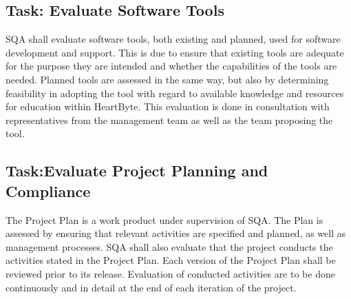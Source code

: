 \documentclass{article}
\begin{document}
	
	\subsection{Task: Evaluate Software Tools}
	SQA shall evaluate software tools, both existing and planned, used for software development and support. This is due to ensure that existing tools are adequate for the purpose they are intended and whether the capabilities of the tools are needed. Planned tools are assessed in the same way, but also by determining feasibility in adopting the tool with regard to available knowledge and resources for education within HeartByte. This evaluation is done in consultation with representatives from the management team as well as the team proposing the tool.
	
	\subsection{Task:Evaluate Project Planning and Compliance}
	The Project Plan is a work product under supervision of SQA. The Plan is assessed by ensuring that relevant activities are specified and planned, as well as management processes. SQA shall also evaluate that the project conducts the activities stated in the Project Plan. Each version of the Project Plan shall be reviewed prior to its release. Evaluation of conducted activities are to be done continuously and in detail at the end of each iteration of the project. 
	
\end{document}
